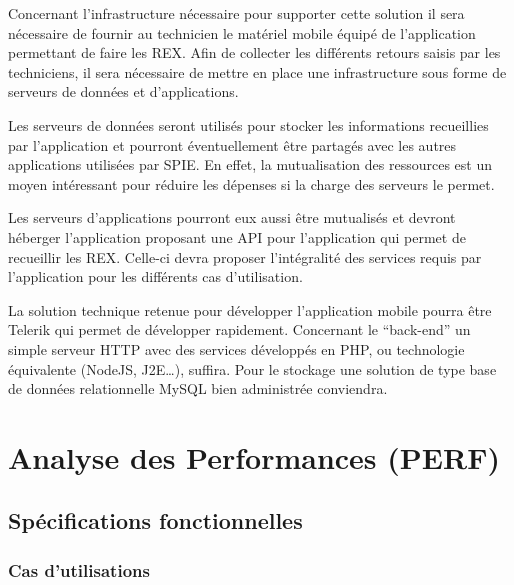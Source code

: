 Concernant l’infrastructure nécessaire pour supporter cette solution il sera nécessaire de fournir au technicien le matériel mobile équipé de l’application permettant de faire les REX. Afin de collecter les différents retours saisis par les techniciens, il sera nécessaire de mettre en place une infrastructure sous forme de serveurs de données  et d’applications. 

Les serveurs de données seront utilisés pour stocker les informations recueillies par l’application et pourront éventuellement être partagés avec les autres applications utilisées par SPIE. En effet, la mutualisation des ressources est un moyen intéressant pour réduire les dépenses si la charge des serveurs le permet.

Les serveurs d’applications pourront eux aussi être mutualisés et devront héberger l’application proposant une API pour l’application qui permet de recueillir les REX. Celle-ci devra proposer l’intégralité des services requis par l’application pour les différents cas d’utilisation.

La solution technique retenue pour développer l’application mobile pourra être Telerik qui permet de développer rapidement. Concernant le “back-end” un simple serveur HTTP avec des services développés en PHP, ou technologie équivalente (NodeJS, J2E…), suffira. Pour le stockage une solution de type base de données relationnelle MySQL bien administrée conviendra.

\section{Analyse des Performances (PERF)}%

\subsection{Spécifications fonctionnelles}

\subsubsection{Cas d’utilisations}

